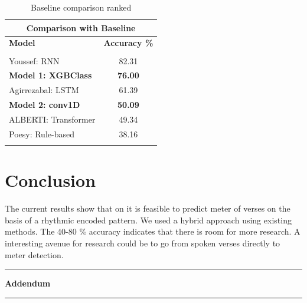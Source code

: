 \documentclass{article}
\begin{document}
\begin{table}[ht]
    \centering
    \begin{tabular}{ |p{5cm}|c| }
    \hline
    \multicolumn{2}{|c|}{\textbf{Comparison with Baseline}} \\
    \hline
    \textbf{Model} & \textbf{Accuracy \%}  \\
    \hline
    & \\
    Youssef: RNN  & 82.31  \\
    \textbf{Model 1: XGBClass} & \textbf{76.00}  \\
    Agirrezabal: LSTM  & 61.39  \\
  
    \textbf{Model 2: conv1D} & \textbf{50.09}   \\
    ALBERTI: Transformer & 49.34\\
    Poesy: Rule-based &  38.16  \\
   & \\
    \hline
    \end{tabular}
    \vspace{5pt}
    \caption{Baseline comparison ranked}
    \label{tab:comparison}
\end{table}


\section{Conclusion}
The current results show that on it is feasible to predict meter of verses on the basis of a rhythmic encoded pattern. We used a hybrid approach using existing methods. The 40-80 \% accuracy indicates that there is room for more research. A interesting avenue for research could be to go from spoken verses directly to meter detection. 

  
  

\clearpage
\vspace*{4pt} %
\hrule 
\vspace{2pt} %

\begin{center}
\Large \textbf*{Addendum}
\label{sec:addendum}
\end{center}

\vspace{2pt} %
\hrule 
\vspace{4pt} %
\end{document}
